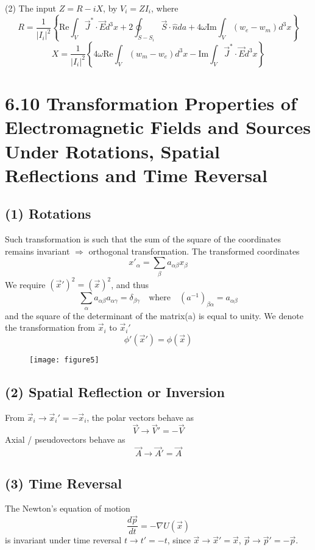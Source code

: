 \documentclass{article}
\begin{document}
	(2) The input $Z = R - iX$, by $V_i = Z I_i$, where
	\[
	R = \frac{1}{|I_i|^2} \left\{ \text{Re} \int_V \vec{J}^* \cdot \vec{E} d^3x + 2\oint_{S-S_i} \vec{S} \cdot \hat{n} da + 4\omega \text{Im} \int_V (w_e - w_m) d^3x \right\}
	\]
	\[
	X = \frac{1}{|I_i|^2} \left\{ 4\omega \text{Re} \int_V (w_m - w_e) d^3x - \text{Im} \int_V \vec{J}^* \cdot \vec{E} d^3x \right\}
	\]
	
	\section*{6.10 Transformation Properties of Electromagnetic Fields and Sources Under Rotations, Spatial Reflections and Time Reversal}
	\subsection*{(1) Rotations}
	Such transformation is such that the sum of the square of the coordinates remains invariant $\Rightarrow$ orthogonal transformation.
	The transformed coordinates
	\[
	x'_{\alpha} = \sum_{\beta} a_{\alpha\beta} x_{\beta}
	\]
	We require $(\vec{x}')^2 = (\vec{x})^2$, and thus
	\[
	\sum_{\alpha} a_{\alpha\beta} a_{\alpha\gamma} = \delta_{\beta\gamma} \quad \text{where} \quad (a^{-1})_{\beta\alpha} = a_{\alpha\beta}
	\]
	and the square of the determinant of the matrix(a) is equal to unity.
	We denote the transformation from $\vec{x}_i$ to $\vec{x}_i'$
	\[
	\phi'(\vec{x}') = \phi(\vec{x})
	\]
	
	\begin{figure}[h]
		\centering
		\texttt{[image: figure5]}
		\caption{}
		\label{fig:figure5}
	\end{figure}
	
	\subsection*{(2) Spatial Reflection or Inversion}
	From $\vec{x}_i \to \vec{x}_i' = -\vec{x}_i$, the polar vectors behave as
	\[
	\vec{V} \to \vec{V}' = -\vec{V}
	\]
	Axial / pseudovectors behave as
	\[
	\vec{A} \to \vec{A}' = \vec{A}
	\]
	
	\subsection*{(3) Time Reversal}
	The Newton's equation of motion
	\[
	\frac{d\vec{p}}{dt} = -\nabla U(\vec{x})
	\]
	is invariant under time reversal $t \to t' = -t$, since $\vec{x} \to \vec{x}' = \vec{x}$, $\vec{p} \to \vec{p}' = -\vec{p}$.\\
	
\end{document}
